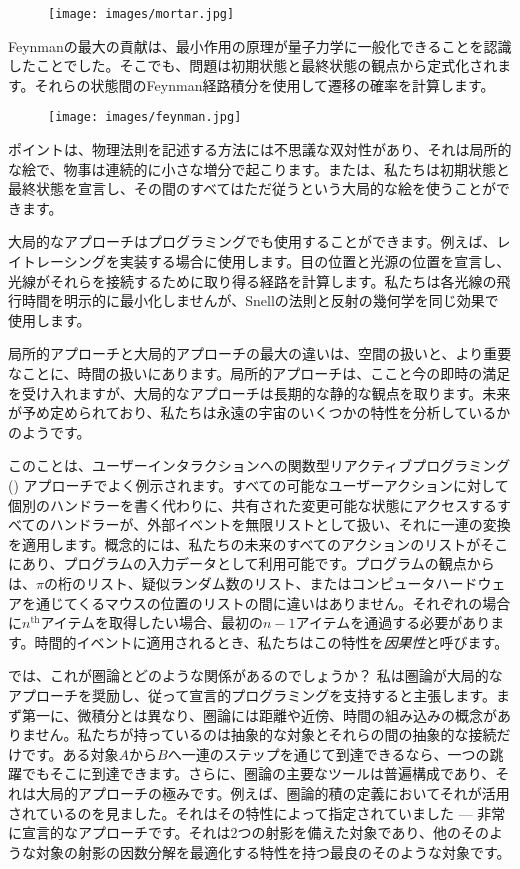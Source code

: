 \begin{figure}[H]
  \centering
  \texttt{[image: images/mortar.jpg]}
\end{figure}

\noindent
Feynmanの最大の貢献は、最小作用の原理が量子力学に一般化できることを認識したことでした。そこでも、問題は初期状態と最終状態の観点から定式化されます。それらの状態間のFeynman経路積分を使用して遷移の確率を計算します。

\begin{figure}[H]
  \centering
  \texttt{[image: images/feynman.jpg]}
\end{figure}

\noindent
ポイントは、物理法則を記述する方法には不思議な双対性があり、それは局所的な絵で、物事は連続的に小さな増分で起こります。または、私たちは初期状態と最終状態を宣言し、その間のすべてはただ従うという大局的な絵を使うことができます。

大局的なアプローチはプログラミングでも使用することができます。例えば、レイトレーシングを実装する場合に使用します。目の位置と光源の位置を宣言し、光線がそれらを接続するために取り得る経路を計算します。私たちは各光線の飛行時間を明示的に最小化しませんが、Snellの法則と反射の幾何学を同じ効果で使用します。

局所的アプローチと大局的アプローチの最大の違いは、空間の扱いと、より重要なことに、時間の扱いにあります。局所的アプローチは、ここと今の即時の満足を受け入れますが、大局的なアプローチは長期的な静的な観点を取ります。未来が予め定められており、私たちは永遠の宇宙のいくつかの特性を分析しているかのようです。

このことは、ユーザーインタラクションへの関数型リアクティブプログラミング () アプローチでよく例示されます。すべての可能なユーザーアクションに対して個別のハンドラーを書く代わりに、共有された変更可能な状態にアクセスするすべてのハンドラーが、外部イベントを無限リストとして扱い、それに一連の変換を適用します。概念的には、私たちの未来のすべてのアクションのリストがそこにあり、プログラムの入力データとして利用可能です。プログラムの観点からは、$\pi$の桁のリスト、疑似ランダム数のリスト、またはコンピュータハードウェアを通じてくるマウスの位置のリストの間に違いはありません。それぞれの場合に$n^\text{th}$アイテムを取得したい場合、最初の$n-1$アイテムを通過する必要があります。時間的イベントに適用されるとき、私たちはこの特性を\emph{因果性}と呼びます。

では、これが圏論とどのような関係があるのでしょうか？ 私は圏論が大局的なアプローチを奨励し、従って宣言的プログラミングを支持すると主張します。まず第一に、微積分とは異なり、圏論には距離や近傍、時間の組み込みの概念がありません。私たちが持っているのは抽象的な対象とそれらの間の抽象的な接続だけです。ある対象$A$から$B$へ一連のステップを通じて到達できるなら、一つの跳躍でもそこに到達できます。さらに、圏論の主要なツールは普遍構成であり、それは大局的アプローチの極みです。例えば、圏論的積の定義においてそれが活用されているのを見ました。それはその特性によって指定されていました --- 非常に宣言的なアプローチです。それは2つの射影を備えた対象であり、他のそのような対象の射影の因数分解を最適化する特性を持つ最良のそのような対象です。

